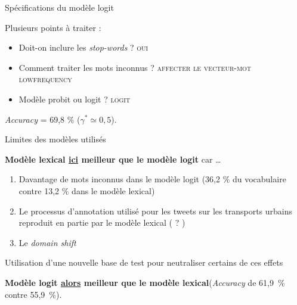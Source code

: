 \documentclass[10pt,xcolor=table,color={dvipsnames,usenames},ignorenonframetext,usepdftitle=false,french]{beamer}
\providecommand{\tightlist}{%
  \setlength{\parskip}{0pt}
  }
\begin{document}
\begin{frame}{Spécifications du modèle logit}
\protect\hypertarget{spuxe9cifications-du-moduxe8le-logit}{}

Plusieurs points à traiter :

\begin{itemize}
\item
  Doit-on inclure les \emph{stop-words} ? \textsc{oui}
\item
  Comment traiter les mots inconnus ?
  \textsc{affecter le vecteur-mot lowfrequency}
\item
  Modèle probit ou logit ? \textsc{logit}
\end{itemize}

\bigskip

\bigskip

\faArrowCircleRight{} \emph{Accuracy} = 69,8 \%
(\(\gamma^* \simeq 0,5\)).

\end{frame}

\begin{frame}{Limites des modèles utilisés}
\protect\hypertarget{limites-des-moduxe8les-utilisuxe9s}{}

\textbf{Modèle lexical \underline{ici} meilleur que le modèle logit} car
\dots

\begin{enumerate}
[1.]
\tightlist
\item
  Davantage de mots inconnus dans le modèle logit (36,2 \% du
  vocabulaire contre 13,2 \% dans le modèle lexical)
\end{enumerate}

\pause

\begin{enumerate}
[1.]
\setcounter{enumi}{1}
\tightlist
\item
  Le processus d’annotation utilisé pour les tweets sur les transports
  urbains reproduit en partie par le modèle lexical ( ? )
\end{enumerate}

\pause

\begin{enumerate}
[1.]
\setcounter{enumi}{2}
\tightlist
\item
  Le \emph{domain shift}
\end{enumerate}

\pause

\bigskip

\faArrowCircleRight{} Utilisation d’une nouvelle base de test pour
neutraliser certains de ces effets

\textbf{Modèle logit \underline{alors} meilleur que le modèle
lexical}\newline(\emph{Accuracy} de 61,9~\% contre 55,9~\%).

\end{frame}
\end{document}
